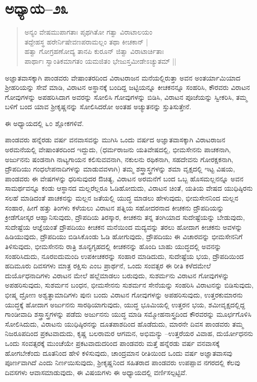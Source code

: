 \section{ಅಧ್ಯಾಯ–೨೩}

\begin{verse}
ಅನ್ಯಂ ವೇಷಮುಪಾಗತಾಃ ಪೃಥಗಿತೋ ಗತ್ವಾ ವಿರಾಟಾಲಯಂ\\ ತದ್ದೇಹಸ್ಥ ಹರೇರ್ನಿಷೇವಣಪರಾಮಲ್ಲಂ ತಥಾ ಕೀಚಕಾನ್ |\\ ಹತ್ವಾ ಗೋಗ್ರಹಣೋದ್ಯ ತಾನಪಿ ಕುರೂನ್ ಜಿತ್ವಾ ವಿರಾಟಾರ್ಚಿತಾಃ \\ಪಾರ್ಥಾಃ ಸ್ವಾಂತಿಕಮಾಗತಂ ಯಮಜಿತಂ ಭೇಜುಸ್ತಮೀಡೇಽಚ್ಯುತಮ್ ||
\end{verse}

ಅಜ್ಞಾತವಾಸಕ್ಕಾಗಿ ಪಾಂಡವರು ವೇಷಾಂತರದಿಂದ ವಿರಾಟರಾಜನ ಮನೆಯಲ್ಲಿರುತ್ತಾ ಅವನ ಅಂತರ್ಯಾಮಿಯಾದ ಶ‍್ರೀಹರಿಯನ್ನು ಸೇವೆ ಮಾಡಿ, ವಿರಾಟನ ಅಸ್ಥಾನಕ್ಕೆ ಬಂದಿದ್ದ ಜಟ್ಟಿಯನ್ನೂ ಕೀಚಕನನ್ನೂ ಸಂಹರಿಸಿ, ಕೌರವರು ವಿರಾಟನ ಗೋವುಗಳನ್ನು ಅಪಹರಿಸಿದಾಗ ಅವರನ್ನು ಸೋಲಿಸಿ ಗೋವುಗಳನ್ನು ಬಿಡಿಸಿ, ವಿರಾಟನ ಪೂಜೆಯನ್ನು ಸ್ವೀಕರಿಸಿ, ತಮ್ಮ ಬಳಿಗೆ ಬಂದ ಯಾವ ಶ‍್ರೀಕೃಷ್ಣನನ್ನು ಸೋಲಿಸಿದರೋ ಅಂತಹ ಅಚ್ಯುತನನ್ನು ಸ್ತುತಿಸುತ್ತೇನೆ.

ಈ ಅಧ್ಯಾಯದಲ್ಲಿ ೬೦ ಶ್ಲೋಕಗಳಿವೆ.

ಪಾಂಡವರು ಹನ್ನೆರಡು ವರ್ಷ ವನವಾಸವನ್ನು ಮುಗಿಸಿ ಒಂದು ವರ್ಷದ ಅಜ್ಞಾತವಾಸಕ್ಕಾಗಿ ವಿರಾಟರಾಜನ ಅರಮನೆಯಲ್ಲಿ ವೇಷಾಂತರದಿಂದ ಇದ್ದುದು, (ಧರ್ಮರಾಜನು ಯತಿವೇಷದಲ್ಲಿ, ಭೀಮಸೇನನು ಪಾಚಕನಾಗಿ, ಅರ್ಜುನನು ಷಂಡನಾಗಿ ನಾಟ್ಯಗಾಯನ ಕಲಿಸುವವನಾಗಿ, ನಕುಲನು ರಥಿಕನಾಗಿ, ಸಹದೇವನು ಗೋರಕ್ಷಕನಾಗಿ, ದ್ರೌಪದಿಯು ಗಂಧಲೇಪನಾದಿಗಳನ್ನು ಮಾಡುವವಳಾಗಿ) ತಮ್ಮ ಶಸ್ತ್ರಾಸ್ತ್ರಗಳನ್ನು ಶಮಾ ವೃಕ್ಷದಲ್ಲಿ ಇಟ್ಟ ವಿಷಯ, ಪಾಂಡವರು ಈ ವೇಷಗಳನ್ನು ಧರಿಸುವುದರ ಔಚಿತ್ಯ, ವಿರಾಟನ ಅರಮನೆಗೆ ಬಂದ ಒಬ್ಬ ಹೊಸಮಲ್ಲನನ್ನೂ ಅವನ ಸಾಮರ್ಥವನ್ನೂ ಕಂಡು ಆಸ್ಥಾನದ ಮಲ್ಲರೆಲ್ಲರೂ ಓಡಿಹೋದುದು, ವಿರಾಟನ ಚಿಂತೆ, ಯತಿಯ ವೇಷದ ಯುಧಿಷ್ಠಿರನು ಸಲಹೆ ಮಾಡಿದಂತೆ ಪಾಚಕನನ್ನು ಮಲ್ಲನ ಜತೆಯಲ್ಲಿ ಯುದ್ಧ ಮಾಡಲು ಹೇಳುವುದು, ಭೀಮಸೇನನಿಂದ ಮಲ್ಲನ ಸಂಹಾರ, ಹೀಗೆ ಹತ್ತು ತಿಂಗಳು ಕಳೆಯಲು ವಿರಾಟನ ಪತ್ನಿಯ ಸಹೋದರನಾದ ಕೀಚಕನು ದ್ರೌಪದಿಯನ್ನು ಕ್ರೀಡೆಗೋಸ್ಕರ ಆಹ್ವಾನಿಸುವುದು, ದ್ರೌಪದಿಯ ತಿರಸ್ಕಾರ, ಕೀಚಕನು ತನ್ನ ತಂಗಿಯಾದ ಸುದೇಷ್ಟೆಯನ್ನು ಬೇಡುವುದು, ಸುದೇಷ್ಟೆಯ ಆಜ್ಞೆಯಂತೆ ದ್ರೌಪದಿಯು ಕೀಚಕನ ಮನೆಯಿಂದ ಮದ್ಯವನ್ನು ತರಲು ಹೋದಾಗ ಕೀಚಕನು ಅವಳನ್ನು ಹಿಡಿಯುವುದು, ದ್ರೌಪದಿಯು ಬಿಡಿಸಿಕೊಂಡು ಓಡಿ ಹೋಗುವುದು, ದ್ರೌಪದಿಯು ಈ ವಿಚಾರವನ್ನು ಭೀಮಸೇನನಿಗೆ ತಿಳಿಸುವುದು, ಭೀಮಸೇನನು ರಾತ್ರಿ ಶೂನ್ಯಗೃಹದಲ್ಲಿ ಕೀಚಕನನ್ನು ಹೊಂದಿ ಬಾಹು ಯುದ್ಧದಲ್ಲಿ ಅವನನ್ನು ಸಂಹರಿಸಿದುದು, ನೂರಐದುಮಂದಿ ಉಪಕೀಚಕರನ್ನು ಸಂಹಾರ ಮಾಡಿದುದು, ಸುದೇಷ್ಟೆಯ ಭಯ, ದ್ರೌಪದಿಯಿಂದ ಹದಿಮೂರು ದಿವಸಗಳು ಮಾತ್ರ ರಕ್ಷಿಸು ಎಂಬ ಪ್ರಾರ್ಥನೆ, ಒಂದು ಸಂವತ್ಸರ ಈ ರೀತಿ ಕಳೆದಮೇಲೆ ದುರ್ಯೊಧನಾದಿಗಳು ವಿರಾಟನ ಮೇಲೆ ಹಲ್ಲೆಮಾಡಲು ಬರುವುದು, ಸುಶರ್ಮನು ವಿರಾಟನ ಗೋವುಗಳನ್ನು ಅಪಹರಿಸುವುದು, ಸುಶರ್ಮನ ಬಂಧನ, ಭೀಮಸೇನನು ಸುಶರ್ಮನ ಸೇನೆಯನ್ನು ಸಂಹರಿಸಿ ವಿರಾಟನನ್ನು ಬಿಡಿಸುವುದು, ಭೀಷ್ಮ ದ್ರೋಣ ಅಶ್ವತ್ಥಾಮಾದಿಗಳು ಪುನಃ ಬಂದು ವಿರಾಟನ ಗೋವುಗಳನ್ನು ಅಪಹರಿಸುವುದು, ಉತ್ತರಕುಮಾರನು ಯುದ್ಧಕ್ಕೆ ಹೋದಾಗ ಅರ್ಜುನನು ಸಾರಥಿಯಾಗುವುದು, ಯುದ್ಧ ಭೂಮಿಯಲ್ಲಿ ಉತ್ತರನ ಭಯ, ಶಮೀವೃಕ್ಷದಲ್ಲಿದ್ದ ಗಾಂಡೀವಾದಿ ಶಸ್ತ್ರಾಸ್ತ್ರಗಳನ್ನು ಪಡೆದು ಅರ್ಜುನನು ಯುದ್ಧ ಮಾಡಿ ಸಮ್ಮೋಹನಾಸ್ತ್ರದಿಂದ ಕೌರವರನ್ನು ಮೂರ್ಛಗೊಳಿಸಿ ಸೋಲಿಸಿದುದು, ವಿರಾಟನು ಯುಧಿಷ್ಠಿರನನ್ನು ದೂತಪಾಶದಿಂದ ಹೊಡೆದುದು, ಮಾರನೇ ದಿವಸ ಪಾಂಡವರು ತಮ್ಮ ನಿಜರೂಪದಿಂದ ಪ್ರಕಟವಾದುದು, ಕೃಷ್ಣ ಬಲರಾಮರ ಆಗಮನ, ಅಭಿಮನ್ಯು –ಉತ್ತರೆಯರ ವಿವಾಹ, ದುರ್ಯೋಧನನು ಒಂದು ಸಂವತ್ಸರಕ್ಕೆ ಮುಂಚೆಯೇ ಪ್ರಕಟವಾದುದರಿಂದ ಪಾಂಡವರು ಮತ್ತೆ ಹನ್ನೆರಡು ವರ್ಷ ವನವಾಸಕ್ಕೆ ಹೋಗಬೇಕೆಂದು ದೂತನಿಂದ ಹೇಳಿ ಕಳಿಸುವುದು, ಚಾಂದ್ರಮಾನ ರೀತಿಯಿಂದ ಒಂದು ವರ್ಷ ಅಜ್ಞಾತವಾಸವು ಪೂರ್ಣವಾಗಿದೆ ಎಂದು ನಿರ್ಣಯಿಸುವುದು, ಶ‍್ರೀಕೃಷ್ಣನಿಂದ ಸಹಿತರಾದ ಪಾಂಡವರು ಉಪಪ್ಪಾವ ನಗರದಲ್ಲಿ ಕೆಲವು ದಿವಸಗಳು ಆವಾಸಮಾಡುವುದು, ಈ ವಿಷಯಗಳು ಈ ಅಧ್ಯಾಯದಲ್ಲಿ ವರ್ಣಿಸಲ್ಪಟ್ಟಿವೆ.


